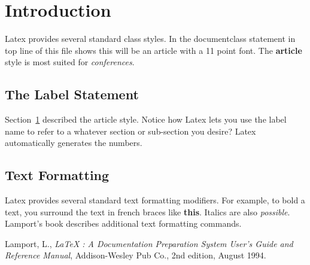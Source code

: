 \documentclass[11pt]{article}
\begin{document}
         
\section{Introduction}
\label{Introduction}

Latex provides several standard class styles.  In the
documentclass statement in top line of this file shows this
will be an article with a 11 point font.  The {\bf article} 
style is most suited for {\it conferences}.

\subsection{The Label Statement}
\label{labelStatement}

Section~\ref{Introduction} described the article style.  Notice
how Latex lets you use the label name to refer to a whatever
section or sub-section you desire?  Latex automatically generates
the numbers.

\subsection{Text Formatting}
\label{textFormatting}

Latex provides several standard text formatting modifiers.
For example, to bold a text, you surround the text in french
braces like {\bf this}.  Italics are also {\it possible}.
Lamport's book \cite{lamport} describes additional text formatting
commands.

\begin{thebibliography}{99}
 Lamport, L., {\it LaTeX : A Documentation
 Preparation System User's Guide and Reference Manual}, Addison-Wesley 
 Pub Co., 2nd edition, August 1994.
\end{thebibliography}
 
\end{document}
